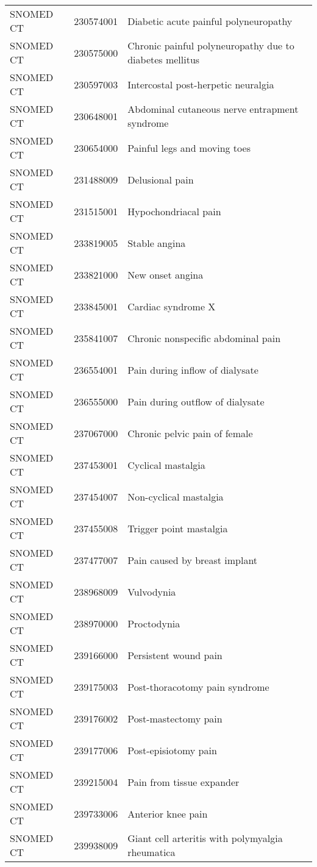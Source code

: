 \begin{longtable}{p{}p{}p{}}
  SNOMED CT & 230574001 & Diabetic acute painful polyneuropathy \\ 
  SNOMED CT & 230575000 & Chronic painful polyneuropathy due to diabetes mellitus \\ 
  SNOMED CT & 230597003 & Intercostal post-herpetic neuralgia \\ 
  SNOMED CT & 230648001 & Abdominal cutaneous nerve entrapment syndrome \\ 
  SNOMED CT & 230654000 & Painful legs and moving toes \\ 
  SNOMED CT & 231488009 & Delusional pain \\ 
  SNOMED CT & 231515001 & Hypochondriacal pain \\ 
  SNOMED CT & 233819005 & Stable angina \\ 
  SNOMED CT & 233821000 & New onset angina \\ 
  SNOMED CT & 233845001 & Cardiac syndrome X \\ 
  SNOMED CT & 235841007 & Chronic nonspecific abdominal pain \\ 
  SNOMED CT & 236554001 & Pain during inflow of dialysate \\ 
  SNOMED CT & 236555000 & Pain during outflow of dialysate \\ 
  SNOMED CT & 237067000 & Chronic pelvic pain of female \\ 
  SNOMED CT & 237453001 & Cyclical mastalgia \\ 
  SNOMED CT & 237454007 & Non-cyclical mastalgia \\ 
  SNOMED CT & 237455008 & Trigger point mastalgia \\ 
  SNOMED CT & 237477007 & Pain caused by breast implant \\ 
  SNOMED CT & 238968009 & Vulvodynia \\ 
  SNOMED CT & 238970000 & Proctodynia \\ 
  SNOMED CT & 239166000 & Persistent wound pain \\ 
  SNOMED CT & 239175003 & Post-thoracotomy pain syndrome \\ 
  SNOMED CT & 239176002 & Post-mastectomy pain \\ 
  SNOMED CT & 239177006 & Post-episiotomy pain \\ 
  SNOMED CT & 239215004 & Pain from tissue expander \\ 
  SNOMED CT & 239733006 & Anterior knee pain \\ 
  SNOMED CT & 239938009 & Giant cell arteritis with polymyalgia rheumatica \\ 

\end{longtable}
